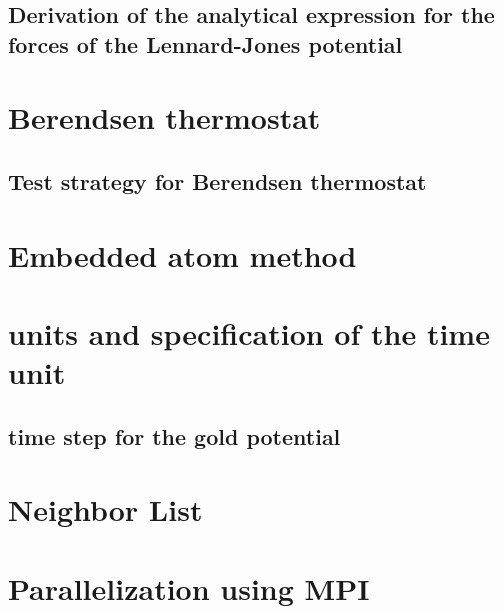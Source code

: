 \subsection{Derivation of the analytical expression for the forces of the Lennard-Jones potential}

\section{Berendsen thermostat}
\subsection{Test strategy for Berendsen thermostat}

\section{Embedded atom method}
\section{units and specification of the time unit}
\subsection{time step for the gold potential}


\section{Neighbor List}

\section{Parallelization using MPI}